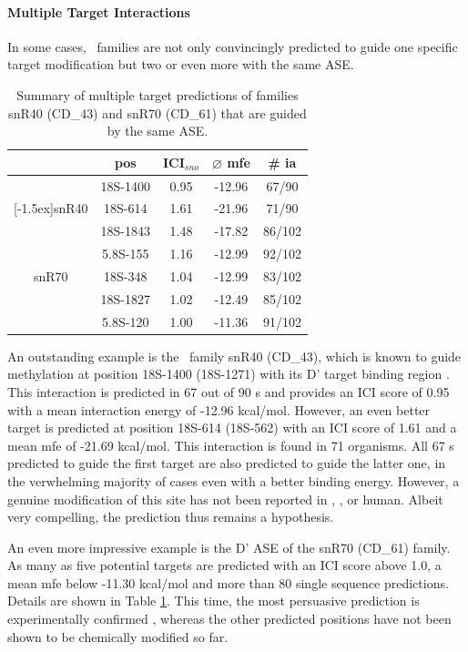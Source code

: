 \paragraph{\textbf{Multiple Target Interactions}}
In some cases, \sno\ families are not only convincingly predicted to guide
one specific target modification but two or even more with the same ASE.
\begin{table}
  \caption{Summary of multiple target predictions of families 
    snR40 (CD\_43) and snR70 (CD\_61) that are guided by the same ASE.}
  \label{tab:redundant_predictions}
  \begin{center}
    \begin{footnotesize}
      \begin{tabular}{c|c|c|c|c}
        &pos&ICI$_{sno}$&$\varnothing$
          mfe&\# ia\\
        \hline
        &18S-1400&0.95&-12.96&67/90\\
        \raisebox{1.5ex}[-1.5ex]{snR40}&18S-614&1.61&-21.96&71/90\\
        \hline
        &18S-1843&1.48&-17.82&86/102\\
        &5.8S-155&1.16&-12.99&92/102\\
        snR70&18S-348&1.04&-12.99&83/102\\
        &18S-1827&1.02&-12.49&85/102\\
        &5.8S-120&1.00&-11.36&91/102\\
      \end{tabular}
    \end{footnotesize}
  \end{center}
\end{table}
An outstanding example is the \cd\ family snR40 (CD\_43), which
  is known to guide methylation at position 18S-1400 (18S-1271) with its
D' target binding region \cite{Lowe:1999}. This interaction is predicted in
67 out of 90 \sno s and provides an ICI score of 0.95 with a mean
interaction energy of -12.96 kcal/mol. However, an even better target is
predicted at position 18S-614 (18S-562) with an ICI score of 1.61 and a
mean mfe of -21.69 kcal/mol. This interaction is found in 71 organisms. All
67 \sno s predicted to guide the first target are also predicted to guide
the latter one, in the verwhelming majority of cases even with a
better binding energy. However, a genuine modification of this
  site has not been reported in \sce, \ncr, or human. Albeit very
  compelling, the prediction thus remains a hypothesis.

An even more impressive example is the D' ASE of the snR70 (CD\_61)
family.  As many as five potential targets are predicted with an ICI
score above 1.0, a mean mfe below -11.30 kcal/mol and more than 80 single
sequence predictions. Details are shown in Table
\ref{tab:redundant_predictions}. This time, the most persuasive prediction
is experimentally confirmed \cite{Lowe:1999}, whereas the other predicted
positions have not been shown to be chemically modified so far.

